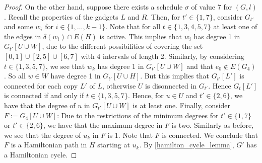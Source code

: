 \documentclass[10pt,a4paper]{article}
\numberwithin{equation}{section}
\newcommand{\set}[1]{\{ #1 \}}
\newcommand{\fromto}[2]{\set{#1, \ldots, #2}}
\begin{document}
\begin{proof}
On the other hand, suppose there exists a schedule $\sigma$ of value 7 for $(G, l)$.  
Recall the properties of the gadgets $L$ and $R$. Then, for $t' \in \set{1, 7}$, consider $G_{t'}$ and some $w_i$ for $i \in \fromto{1}{k-1}$. Note that for all $t \in \set{1, 3, 4, 5, 7}$ at least one of the edges in $\delta(w_i) \cap E(H)$ is active. This implies that $w_i$ has degree 1 in $G_{t'}[U \cup W]$, due to the different possibilities of covering the set $[0, 1] \cup [2, 5] \cup [6, 7]$ with 4 intervals of length 2. Similarly, by considering $t \in \set{1, 3, 5, 7}$, we see that $w_k$ has degree 1 in $G_{t'}[U \cup W]$ and that $e_0 \not \in E(G_{4})$. So all $w \in W$ have degree 1 in $G_{t'}[U \cup H]$. But this implies that $G_{t'}[L']$ is connected for each copy $L'$ of $L$, otherwise $U$ is disonnected in $G_{t'}$. Hence $G_t[L']$ is connected if and only if $t \in \set{1, 3, 5, 7}$. Hence, for $u \in U$ and $t' \in \set{2, 6}$, we have that the degree of $u$ in $G_{t'}[U \cup W]$ is at least one. Finally, consider $F := G_{4}[U \cup W]$: Due to the restrictions of the minimum degrees for $t' \in \set{1, 7}$ or $t' \in \set{2, 6}$, we have that the maximum degree in $F$ is two. Similarly as before, we see that the degree of $u_k$ in $F$ is 1. Note that $F$ is connected. We conclude that $F$ is a Hamiltonian path in $H$ starting at $u_k$. By \cref{hamilton_cycle_lemma}, $G'$ has a Hamiltonian cycle.

\end{proof}
\end{document}
